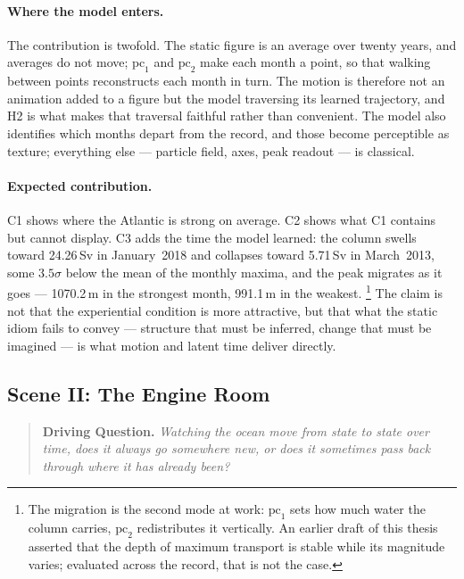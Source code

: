 \paragraph{Where the model enters.} The contribution is twofold. The static figure is an average over twenty years, and averages do not move; $\mathrm{pc}_1$ and $\mathrm{pc}_2$ make each month a point, so that walking between points reconstructs each month in turn. The motion is therefore not an animation added to a figure but the model traversing its learned trajectory, and H2 is what makes that traversal faithful rather than convenient. The model also identifies which months depart from the record, and those become perceptible as texture; everything else --- particle field, axes, peak readout --- is classical.

\paragraph{Expected contribution.} C1 shows where the Atlantic is strong on average. C2 shows what C1 contains but cannot display. C3 adds the time the model learned: the column swells toward 24.26\,Sv in January~2018 and collapses toward 5.71\,Sv in March~2013, some $3.5\sigma$ below the mean of the monthly maxima, and the peak migrates as it goes --- 1070.2\,m in the strongest month, 991.1\,m in the weakest.
\footnote{The migration is the second mode at work: $\mathrm{pc}_1$ sets how much water the column carries, $\mathrm{pc}_2$ redistributes it vertically. An earlier draft of this thesis asserted that the depth of maximum transport is stable while its magnitude varies; evaluated across the record, that is not the case.} The claim is not that the experiential condition is more attractive, but that what the static idiom fails to convey --- structure that must be inferred, change that must be imagined --- is what motion and latent time deliver directly.

\subsection{Scene II: The Engine Room}
\label{subsec:scene-engine}

\begin{quote}
\textbf{Driving Question.} \emph{Watching the ocean move from state to state over time, does it always go somewhere new, or does it sometimes pass back through where it has already been?}
\end{quote}



